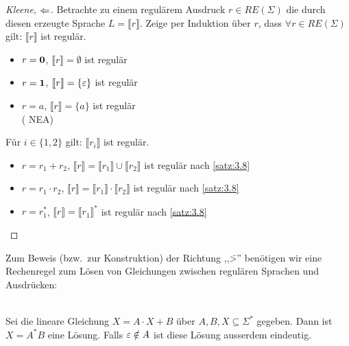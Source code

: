 {\begin{proof}[Kleene, $\<=$]
Betrachte zu einem regulärem Ausdruck $r\in RE(\Sigma)$ die durch diesen erzeugte Sprache $L=\llbracket r \rrbracket$. Zeige per Induktion über $r$, dass $ \forall r\in RE(\Sigma) $ gilt: $ \llbracket r \rrbracket$ ist regulär.
    	\begin{description}[font=\normalfont]
      \item[I.A.:] \hfill
        \vspace{-\baselineskip}
        \begin{itemize}
        \item $r = \mathbf{0}$, $\llbracket r \rrbracket = \emptyset$ ist regulär
        \item $r = \mathbf{1}$, $\llbracket r \rrbracket = \{ \varepsilon \}$ ist regulär
        \item $r = a$, $\llbracket r \rrbracket = \{ a \}$ ist regulär \\
          (
    			 \quad\acs{NEA}) 
        \end{itemize}
        \item[I.V.:] Für $i \in \{1, 2\}$ gilt: $\llbracket r_i \rrbracket$ ist regulär.
    		\item[I.S.:] \hfill
          \vspace{-\baselineskip}
          \begin{itemize}
          \item $r = r_1 + r_2$, $\llbracket r \rrbracket = \llbracket r_1 \rrbracket \cup \llbracket r_2 \rrbracket$ ist regulär nach \autoref{satz:3.8}
          \item $r = r_1 \cdot r_2$, $\llbracket r \rrbracket = \llbracket r_1 \rrbracket \cdot \llbracket r_2 \rrbracket$ ist regulär nach \autoref{satz:3.8}
          \item $r = r_1^*$, $\llbracket r \rrbracket = \llbracket r_1 \rrbracket^*$ ist regulär nach \autoref{satz:3.8}
          \end{itemize}
		\end{description}
\end{proof}

Zum Beweis (bzw.\ zur Konstruktion) der Richtung ,,\=>'' benötigen wir eine Rechenregel zum Lösen von Gleichungen zwischen regulären Sprachen und Ausdrücken:
\begin{lemma}\label{lem:arden}\ \\
        Sei die lineare Gleichung $X=A\cdot X+B$ über $A, B, X\subseteq \Sigma^*$ gegeben. Dann ist $X=A^*B$ eine Lösung. Falls $\varepsilon \notin A$ ist diese Lösung ausserdem eindeutig.
\end{lemma}

}
